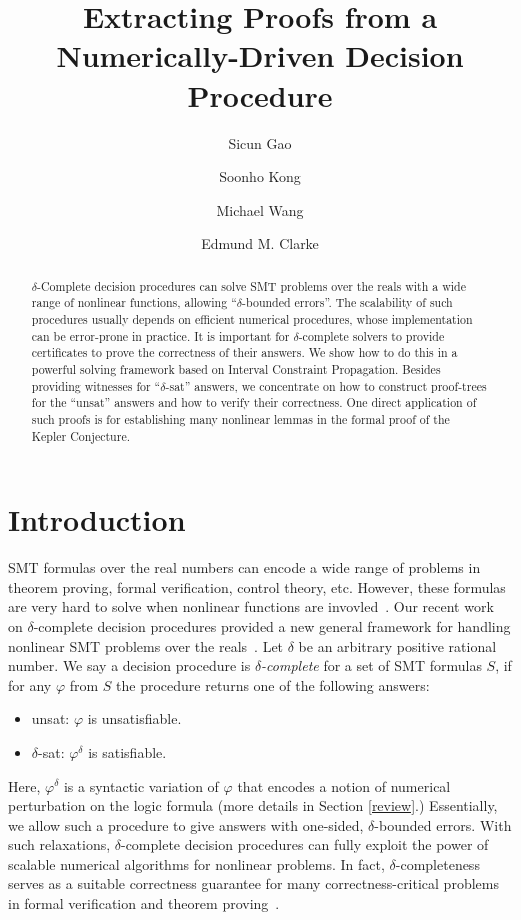 \documentclass[envcountsect]{llncs}
\title{Extracting Proofs from a Numerically-Driven Decision Procedure}
\author{Sicun Gao \and Soonho Kong \and Michael Wang \and Edmund M. Clarke}
\institute{Carnegie Mellon University, Pittsburgh, PA 15213}
\begin{document}
\maketitle

\begin{abstract}
$\delta$-Complete decision procedures can solve SMT problems over the
reals with a wide range of nonlinear functions, allowing ``$\delta$-bounded
errors''. The scalability of such procedures usually depends on efficient
numerical procedures, whose implementation can be error-prone in practice.
It is important for $\delta$-complete solvers to provide certificates to prove
the correctness of their answers. 
We show how to do this in a powerful solving framework based
on Interval Constraint Propagation. Besides providing witnesses for ``$\delta$-sat''
answers, we concentrate on how to construct proof-trees for the ``unsat''
answers and how to verify their correctness. One direct application of such proofs 
is for establishing many nonlinear lemmas in the formal proof of the Kepler Conjecture. 
\end{abstract}

\section{Introduction}

SMT formulas over the real numbers can encode a wide range of problems in 
theorem proving, formal verification, control theory, etc. However, these 
formulas are very hard to solve when nonlinear functions are invovled~\cite{}. 
Our recent work on {$\delta$-complete decision procedures}
provided a new general framework for handling nonlinear SMT problems over the
reals~\cite{}. Let $\delta$ be an arbitrary positive rational number. We say a decision
procedure is {\em $\delta$-complete} for a set of SMT formulas $S$, if for any
$\varphi$ from $S$ the procedure returns
one of the following answers:
\begin{itemize}
 \item {\sf unsat}: $\varphi$ is unsatisfiable.
 \item {\sf $\delta$-sat}: $\varphi^{\delta}$ is satisfiable. 
\end{itemize}
Here, $\varphi^{\delta}$ is a syntactic variation of $\varphi$ that encodes a
notion of numerical perturbation on the logic formula (more 
details in Section \ref{review}.) Essentially, we allow such a procedure to
give answers with one-sided, $\delta$-bounded errors. With such relaxations,
$\delta$-complete decision procedures can fully exploit the
power of scalable numerical algorithms for nonlinear
problems. In fact, $\delta$-completeness serves as a suitable correctness
guarantee for many correctness-critical problems in formal
verification and theorem proving~\cite{}. 
\end{document}
